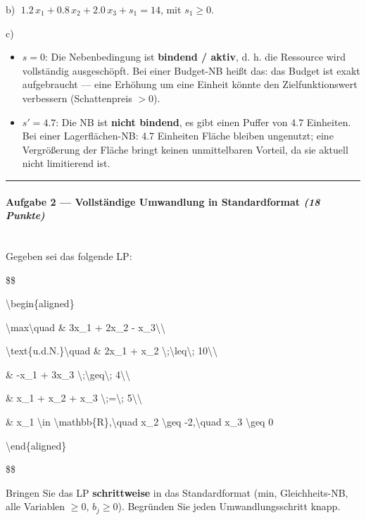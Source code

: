 \documentclass[11pt, a4paper]{article}
\begin{document}
b) $\;1.2\,x_1 + 0.8\,x_2 + 2.0\,x_3 + s_1 = 14$, mit $s_1 \geq 0$.


c)

\begin{itemize}
  \item $s = 0$: Die Nebenbedingung ist \textbf{bindend / aktiv}, d. h. die Ressource wird vollständig ausgeschöpft. Bei einer Budget-NB heißt das: das Budget ist exakt aufgebraucht — eine Erhöhung um eine Einheit könnte den Zielfunktionswert verbessern (Schattenpreis $> 0$).
  \item $s' = 4.7$: Die NB ist \textbf{nicht bindend}, es gibt einen Puffer von 4.7 Einheiten. Bei einer Lagerflächen-NB: 4.7 Einheiten Fläche bleiben ungenutzt; eine Vergrößerung der Fläche bringt keinen unmittelbaren Vorteil, da sie aktuell nicht limitierend ist.
\end{itemize}


\noindent\textcolor{rulegray}{\rule{\linewidth}{0.4pt}}


\paragraph{Aufgabe 2 — Vollständige Umwandlung in Standardformat \textit{(18 Punkte)}}\mbox{}\\[2pt]

Gegeben sei das folgende LP:


\$\$

\textbackslash{}begin\{aligned\}

\textbackslash{}max\textbackslash{}quad \& 3x\_1 + 2x\_2 - x\_3\textbackslash{}\textbackslash{}

\textbackslash{}text\{u.d.N.\}\textbackslash{}quad \& 2x\_1 + x\_2 \textbackslash{};\textbackslash{}leq\textbackslash{}; 10\textbackslash{}\textbackslash{}

\& -x\_1 + 3x\_3 \textbackslash{};\textbackslash{}geq\textbackslash{}; 4\textbackslash{}\textbackslash{}

\& x\_1 + x\_2 + x\_3 \textbackslash{};=\textbackslash{}; 5\textbackslash{}\textbackslash{}

\& x\_1 \textbackslash{}in \textbackslash{}mathbb\{R\},\textbackslash{}quad x\_2 \textbackslash{}geq -2,\textbackslash{}quad x\_3 \textbackslash{}geq 0

\textbackslash{}end\{aligned\}

\$\$


Bringen Sie das LP \textbf{schrittweise} in das Standardformat (min, Gleichheits-NB, alle Variablen $\geq 0$, $b_j \geq 0$). Begründen Sie jeden Umwandlungsschritt knapp.
\end{document}
